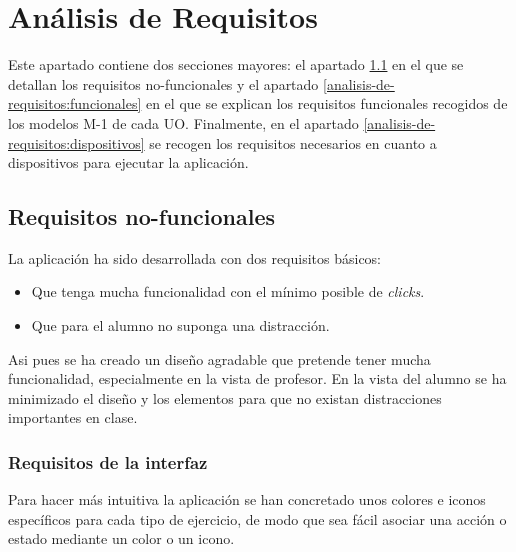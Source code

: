 
\chapter{Análisis de Requisitos}
\label{analisis-de-requisitos}

Este apartado contiene dos secciones mayores: el apartado \ref{analisis-de-requisitos:no-funcionales} en el que se detallan los requisitos no-funcionales y el apartado \ref{analisis-de-requisitos:funcionales} en el que se explican los requisitos funcionales recogidos de los modelos M-1 de cada UO. Finalmente, en el apartado \ref{analisis-de-requisitos:dispositivos} se recogen los requisitos necesarios en cuanto a dispositivos para ejecutar la aplicación.\\

\section{Requisitos no-funcionales}
\label{analisis-de-requisitos:no-funcionales}

La aplicación ha sido desarrollada con dos requisitos básicos:

\begin{itemize}
\item Que tenga mucha funcionalidad con el mínimo posible de \textit{clicks}.
\item Que para el alumno no suponga una distracción.
\end{itemize}

Asi pues se ha creado un diseño agradable que pretende tener mucha funcionalidad, especialmente en la vista de profesor. En la vista del alumno se ha minimizado el diseño y los elementos para que no existan distracciones importantes en clase.\\

\subsection{Requisitos de la interfaz}
\label{analisis-de-requisitos:no-funcionales:interfaz}

Para hacer más intuitiva la aplicación se han concretado unos colores e iconos específicos para cada tipo de ejercicio, de modo que sea fácil asociar una acción o estado mediante un color o un icono.

